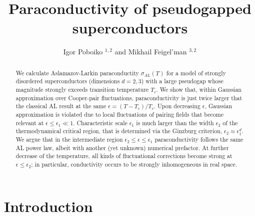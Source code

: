 \documentclass[twocolumn,english,prb]{revtex4-1}
\begin{document}
\title{Paraconductivity of pseudogapped superconductors}

\author{Igor Poboiko $^{1,2}$ and Mikhail Feigel'man $^{3,2}$}







\begin{abstract}
We calculate Aslamazov-Larkin  paraconductity $\sigma_{AL}(T)$
 for a model of  strongly disordered superconductors (dimensions $d=2,3$) with a 
large pseudogap whose magnitude strongly  exceeds transition temperature $T_c$. 
We show that, within Gaussian approximation over Cooper-pair fluctuations,
paraconductivity is just twice larger that the classical AL result at the same 
$\epsilon = (T-T_c)/T_c$.  Upon decreasing $\epsilon$,  Gaussian approximation
is violated due to local fluctuations of pairing fields that become relevant
at $\epsilon \leq \epsilon_1 \ll 1 $.  Characteristic scale $\epsilon_1 $
is  much larger than the width $\epsilon_2$ of the thermodynamical critical region,
that is determined via  the Ginzburg criterion, $\epsilon_2 \approx \epsilon_1^d$.
We argue that in the intermediate region $\epsilon_2 \leq \epsilon \leq \epsilon_1$
paraconductivity follows the same AL power law, albeit with another
(yet unknown) numerical prefactor. At further decrease of the temperature,
all kinds of fluctuational corrections become strong at 
$\epsilon \leq \epsilon_2$; in particular, conductivity occurs to be
 strongly  inhomogeneous in real space.
\end{abstract}

\maketitle

\section{Introduction}
\end{document}
